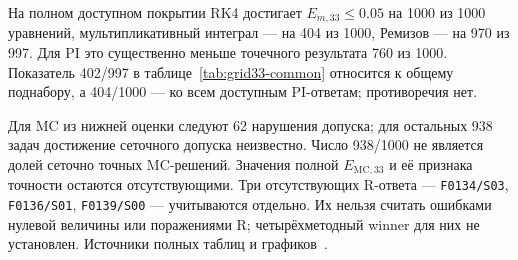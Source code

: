 \documentclass[14pt,a4paper]{extarticle}
\begin{document}
На полном доступном покрытии RK4 достигает $E_{m,33}\le0.05$
на 1000 из 1000 уравнений, мультипликативный интеграл --- на 404
из 1000, Ремизов --- на 970 из 997. Для PI это существенно меньше
точечного результата 760 из 1000. Показатель 402/997
в таблице~\ref{tab:grid33-common} относится к общему поднабору,
а 404/1000 --- ко всем доступным PI-ответам; противоречия нет.


\begin{table}[!htbp]
\centering
\caption{Полное доступное покрытие сохранённой серии. В строке MC
статистики относятся только к нижней оценке $E_{\mathrm{MC},0}$,
а не к неизмеренной $E_{\mathrm{MC},33}$.}
\label{tab:grid33-full}
\end{table}

Для MC из нижней оценки следуют 62 нарушения допуска; для остальных
938 задач достижение сеточного допуска неизвестно. Число 938/1000
не является долей сеточно точных MC-решений. Значения полной
$E_{\mathrm{MC},33}$ и её признака точности остаются отсутствующими.
Три отсутствующих R-ответа --- \texttt{F0134/S03}, \texttt{F0136/S01},
\texttt{F0139/S00} --- учитываются отдельно. Их нельзя считать ошибками
нулевой величины или поражениями R; четырёхметодный winner для них
не установлен. Источники полных таблиц и графиков~\cite{savedgrid33release,savedgrid33figures}.
\end{document}
